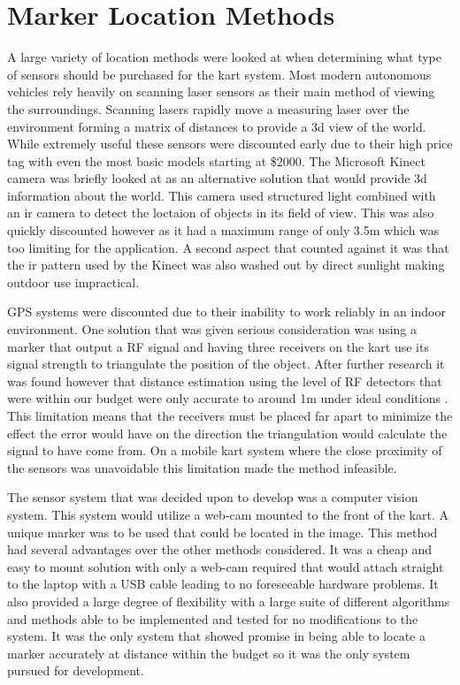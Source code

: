 \section{Marker Location Methods}

A large variety of location methods were looked at when determining what type of sensors should be purchased for the kart system. Most modern autonomous vehicles rely heavily on scanning laser sensors as their main method of viewing the surroundings. Scanning lasers rapidly move a measuring laser over the environment forming a matrix of distances to provide a 3d view of the world. While extremely useful these sensors were discounted early due to their high price tag with even the most basic models starting at \$2000. The Microsoft Kinect camera was briefly looked at as an alternative solution that would provide 3d information about the world. This camera used structured light combined with an ir camera to detect the loctaion of objects in its field of view. This was also quickly discounted however as it had a maximum range of only 3.5m which was too limiting for the application. A second aspect that counted against it was that the ir pattern used by the Kinect was also washed out by direct sunlight making outdoor use impractical.

GPS systems were discounted due to their inability to work reliably in an indoor environment. One solution that was given serious consideration was using a marker that output a RF signal and having three receivers on the kart use its signal strength to triangulate the position of the object. After further research it was found however that distance estimation using the level of RF detectors that were within our budget were only accurate to around 1m under ideal conditions \cite{rf}. This limitation means that the receivers must be placed far apart to minimize the effect the error would have on the direction the triangulation would calculate the signal to have come from. On a mobile kart system where the close proximity of the sensors was unavoidable this limitation made the method infeasible.

The sensor system that was decided upon to develop was a computer vision system. This system would utilize a web-cam mounted to the front of the kart. A unique marker was to be used that could be located in the image. This method had several advantages over the other methods considered. It was a cheap and easy to mount solution with only a web-cam required that would attach straight to the laptop with a USB cable leading to no foreseeable hardware problems. It also provided a large degree of flexibility with a large suite of different algorithms and methods able to be implemented and tested for no modifications to the system. It was the only system that showed promise in being able to locate a marker accurately at distance within the budget so it was the only system pursued for development.